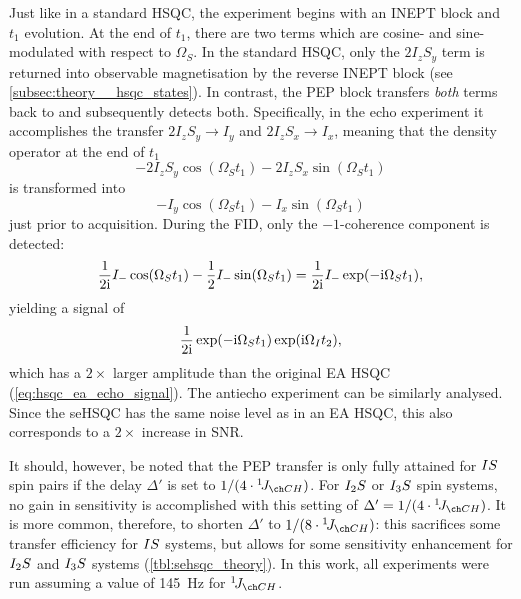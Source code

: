 Just like in a standard HSQC, the experiment begins with an INEPT block and $t_1$ evolution.
At the end of $t_1$, there are two terms which are cosine- and sine-modulated with respect to $\Omega_S$.
In the standard HSQC, only the $2I_zS_y$ term is returned into observable \proton{} magnetisation by the reverse INEPT block (see \cref{subsec:theory__hsqc_states}).
In contrast, the PEP block transfers \textit{both} terms back to \proton{} and subsequently detects both.
Specifically, in the echo experiment it accomplishes the transfer $2I_zS_y \to I_y$ and $2I_zS_x \to I_x$, meaning that the density operator at the end of $t_1$
\begin{equation}
    \label{eq:sehsqc_t1_modulation}
    -2I_zS_y \cos(\Omega_S t_1) - 2I_zS_x \sin(\Omega_S t_1)
\end{equation}
is transformed into
\begin{equation}
    \label{eq:sehsqc_before_detection}
    -I_y \cos(\Omega_S t_1) - I_x \sin(\Omega_S t_1)
\end{equation}
just prior to acquisition.
During the FID, only the $-1$-coherence component is detected:
\begin{equation}
    \label{eq:sehsqc_detection_minusone}
    \frac{1}{2\mathrm{i}}I_- \cos(\Omega_S t_1) - \frac{1}{2}I_- \sin(\Omega_S t_1) = \frac{1}{2\mathrm{i}}I_-\exp(-\mathrm{i} \Omega_S t_1),
\end{equation}
yielding a signal of
\begin{equation}
    \label{eq:s_echo_sehsqc}
    \frac{1}{2\mathrm{i}}\exp(-\mathrm{i} \Omega_S t_1)\exp(\mathrm{i} \Omega_I t_2),
\end{equation}
which has a $2\times$ larger amplitude than the original EA HSQC (\cref{eq:hsqc_ea_echo_signal}).
The antiecho experiment can be similarly analysed.
Since the seHSQC has the same noise level as in an EA HSQC, this also corresponds to a $2\times$ increase in SNR.

It should, however, be noted that the PEP transfer is only fully attained for $IS\/$ spin pairs if the delay $\Delta'$ is set to $1 / (4 \cdot \oneJ{CH})$.
For $I_2S\/$ or $I_3\/S$ spin systems, no gain in sensitivity is accomplished with this setting of $\Delta' = 1 / (4 \cdot \oneJ{CH})$.
It is more common, therefore, to shorten $\Delta'$ to $1 / (8 \cdot \oneJ{CH})$: this sacrifices some transfer efficiency for $IS\/$ systems, but allows for some sensitivity enhancement for $I_2S\/$ and $I_3S\/$ systems (\cref{tbl:sehsqc_theory}).
In this work, all experiments were run assuming a value of \qty{145}{\Hz} for $\oneJ{CH}$.

